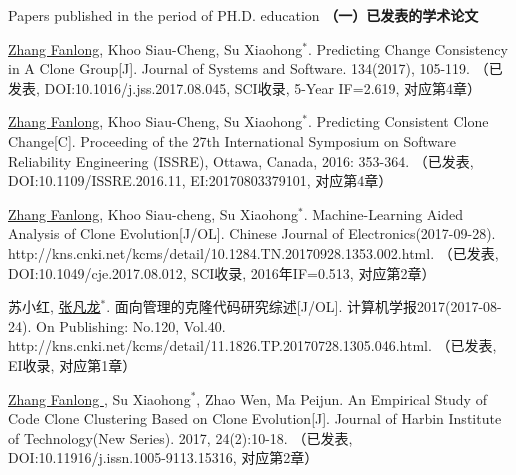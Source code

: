 
 {Papers
published in the period of PH.D. education}
\noindent\textbf{（一）已发表的学术论文}
\begin{publist}

\item
\underline{Zhang Fanlong}, Khoo Siau-Cheng, Su Xiaohong{$^*$}. Predicting Change Consistency in A Clone Group[J]. Journal of Systems and Software. 134(2017), 105-119.
（已发表, DOI:10.1016/j.jss.2017.08.045, SCI收录, 5-Year IF=2.619, 对应第4章）

\item
\underline{Zhang Fanlong}, Khoo Siau-Cheng, Su Xiaohong{$^*$}. Predicting Consistent Clone Change[C]. Proceeding of the 27th International Symposium on Software Reliability Engineering (ISSRE), Ottawa, Canada, 2016: 353-364.
（已发表, DOI:10.1109/ISSRE.2016.11, EI:20170803379101, 对应第4章）

\item
\underline{Zhang Fanlong}, Khoo Siau-cheng, Su Xiaohong{$^*$}. Machine-Learning Aided Analysis of Clone Evolution[J/OL]. Chinese Journal of Electronics(2017-09-28). http://kns.cnki.net/kcms/detail/10.1284.TN.20170928.1353.002.html.
（已发表, DOI:10.1049/cje.2017.08.012, SCI收录, 2016年IF=0.513, 对应第2章）


\item
苏小红, \underline{张凡龙}{$^*$}. 面向管理的克隆代码研究综述[J/OL]. 计算机学报2017(2017-08-24). On Publishing: No.120, Vol.40. http://kns.cnki.net/kcms/detail/11.1826.TP.20170728.1305.046.html.
（已发表, EI收录, 对应第1章）


\item
\underline{Zhang Fanlong }, Su Xiaohong{$^*$},  Zhao Wen,  Ma Peijun. An Empirical Study of Code Clone Clustering Based on Clone Evolution[J]. Journal of Harbin Institute of Technology(New Series). 2017, 24(2):10-18.
（已发表, DOI:10.11916/j.issn.1005-9113.15316, 对应第2章）


\end{publist}
